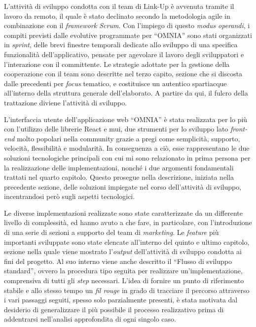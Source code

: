 L'attività di sviluppo condotta con il team di Link-Up è avvenuta tramite il lavoro da remoto, il quale è stato declinato secondo la metodologia agile in combinazione con il \textit{framework Scrum}. Con l'impiego di questo \textit{modus operandi}, i compiti previsti dalle evolutive programmate per “OMNIA” sono stati organizzati in \textit{sprint}, delle brevi finestre temporali dedicate allo sviluppo di una specifica funzionalità dell'applicativo, pensate per agevolare il lavoro degli sviluppatori e l'interazione con il committente. Le strategie adottate per la gestione della cooperazione con il team sono descritte nel terzo capito, sezione che si discosta dalle precedenti per \textit{focus} tematico, e costituisce un autentico spartiacque all'interno della struttura generale dell'elaborato. A partire da qui, il fulcro della trattazione diviene l'attività di sviluppo.

L'interfaccia utente dell'applicazione web “OMNIA” è stata realizzata per lo più con l'utilizzo delle librerie React e \acrlong*{mui}, due strumenti per lo sviluppo lato \textit{front-end} molto popolari nella community grazie a pregi come semplicità, supporto, velocità, flessibilità e modularità. In conseguenza a ciò, esse rappresentano le due soluzioni tecnologiche principali con cui mi sono relazionato in prima persona per la realizzazione delle implementazioni, nonché i due argomenti fondamentali trattati nel quarto capitolo. Questo prosegue nella descrizione, iniziata nella precedente sezione, delle soluzioni impiegate nel corso dell'attività di sviluppo, incentrandosi però sugli aspetti tecnologici.

Le diverse implementazioni realizzate sono state caratterizzate da un differente livello di complessità, ed hanno avuto a che fare, in particolare, con l'introduzione di una serie di sezioni a supporto del team di \textit{marketing}. Le \textit{feature} più importanti sviluppate sono state elencate all'interno del quinto e ultimo capitolo, sezione nella quale viene mostrato l'\textit{output} dell'attività di sviluppo condotta ai fini del progetto. Al suo interno viene anche descritto il “Flusso di sviluppo standard”, ovvero la procedura tipo seguita per realizzare un'implementazione, comprensiva di tutti gli \textit{step} necessari. L'idea di fornire un punto di riferimento stabile e allo stesso tempo un \textit{fil rouge} in grado di tracciare il percorso attraverso i vari passaggi seguiti, spesso solo parzialmente presenti, è stata motivata dal desiderio di generalizzare il più possibile il processo realizzativo prima di addentrarsi nell'analisi approfondita di ogni singolo caso.